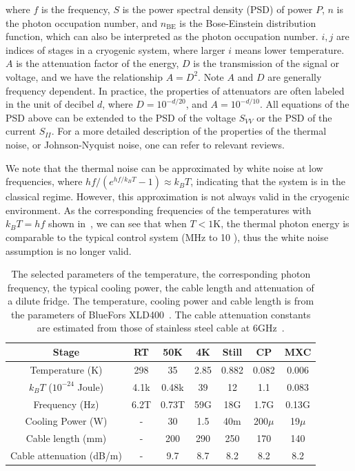 \documentclass[a4paper,onecolumn,11pt,unpublished]{quantumarticle}
\newcommand{\nBE}{n_{\mathrm{BE}}}
\begin{document}
where $f$ is the frequency, $S$ is the power spectral density (PSD) of power $P$, $n$ is the photon occupation number, and $\nBE$ is the Bose-Einstein distribution function, which can also be interpreted as the photon occupation number. $i,j$ are indices of stages in a cryogenic system, where larger $i$ means lower temperature. $A$ is the attenuation factor of the energy, $D$ is the transmission of the signal or voltage, and we have the relationship $A=D^2$. Note $A$ and $D$ are generally frequency dependent.
In practice, the properties of attenuators are often labeled in the unit of decibel $d$, where $D=10^{-d/20}$, and $A=10^{-d/10}$. All equations of the PSD above can be extended to the PSD of the voltage $S_{VV}$ or the PSD of the current $S_{II}$. For a more detailed description of the properties of the thermal noise, or Johnson-Nyquist noise, one can refer to relevant reviews\cite{Clerk2010Introduction}.

We note that the thermal noise can be approximated by white noise at low frequencies, where $hf/(e^{hf/k_B T}-1)\approx k_B T$, indicating that the system is in the classical regime. However, this approximation is not always valid in the cryogenic environment. As the corresponding frequencies of the temperatures with $k_B T = hf$ shown in~, we can see that when $T<1{\text{K}}$, the thermal photon energy is comparable to the typical control system (MHz to 10 ), thus the white noise assumption is no longer valid.

\begin{table}[h!]
  \centering
  \begin{tabular}{ccccccc}
    \hline\hline
    Stage                     & RT   & 50K   & 4K   & Still & CP       & MXC     \\
    \hline
    Temperature (K)           & 298  & 35    & 2.85 & 0.882 & 0.082    & 0.006   \\
    $k_BT$ ($10^{-24}$ Joule) & 4.1k & 0.48k & 39   & 12    & 1.1      & 0.083   \\
    Frequency (Hz)            & 6.2T & 0.73T & 59G  & 18G   & 1.7G     & 0.13G   \\
    Cooling Power (W)         & -    & 30    & 1.5  & 40m   & 200$\mu$ & 19$\mu$ \\
    Cable length (mm)         & -    & 200   & 290  & 250   & 170      & 140     \\
    Cable attenuation (dB/m)  & -    & 9.7   & 8.7  & 8.2   & 8.2      & 8.2     \\
    \hline\hline
  \end{tabular}
  \caption{The selected parameters of the temperature, the corresponding photon frequency, the typical cooling power, the cable length and attenuation of a dilute fridge. The temperature, cooling power and cable length is from the parameters of BlueFors XLD400~\cite{Krinner2019Engineering}. The cable attenuation constants are estimated from those of stainless steel cable at 6GHz~\cite{Kurpiers2017Characterizing}.}

  \label{table:temperature_frequency_relationship}
\end{table}
\end{document}
